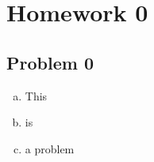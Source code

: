\documentclass{article}
\begin{document}
\section*{Homework 0}

\subsection*{Problem 0}
\begin{enumerate}[(a)]
\item This
\item is
\item a problem
\end{enumerate}
\end{document}
